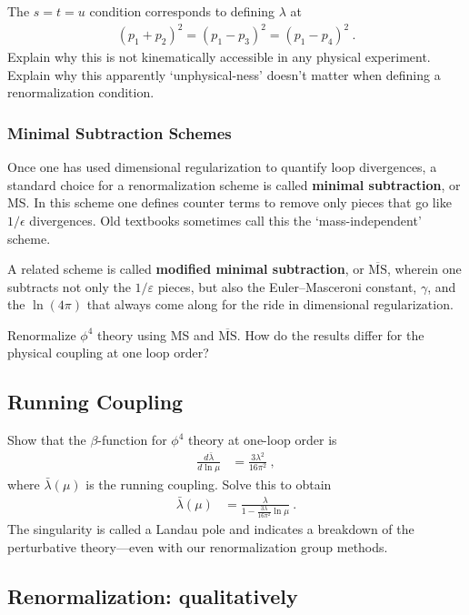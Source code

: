 \documentclass[12pt]{article}
\numberwithin{equation}{subsection}    %
\begin{document}
The $s=t=u$ condition corresponds to defining $\lambda$ at
\begin{align}
	(p_1+p_2)^2 = (p_1 - p_3)^2 = (p_1 - p_4)^2 \ .
\end{align}
Explain why this is not kinematically accessible in any physical experiment. Explain why this apparently `unphysical-ness' doesn't matter when defining a renormalization condition. 



\subsubsection{Minimal Subtraction Schemes}

Once one has used dimensional regularization to quantify loop divergences, a standard choice for a renormalization scheme is called \textbf{minimal subtraction}, or MS. In this scheme one defines counter terms to remove only pieces that go like $1/\epsilon$ divergences. Old textbooks sometimes call this the `mass-independent' scheme.

A related scheme is called \textbf{modified minimal subtraction}, or $\overline{\text{MS}}$, wherein one subtracts not only the $1/\varepsilon$ pieces, but also the Euler--Masceroni constant, $\gamma$, and the $\ln(4\pi)$ that always come along for the ride in dimensional regularization. 

Renormalize $\phi^4$ theory using MS and $\overline{\text{MS}}$. How do the results differ for the physical coupling at one loop order?

\subsection{Running Coupling}

Show that the $\beta$-function for $\phi^4$ theory at one-loop order is
\begin{align}
	\frac{d\bar\lambda}{d\ln\mu} &= \frac{3\lambda^2}{16\pi^2} \ ,
\end{align}
where $\bar\lambda(\mu)$ is the running coupling. Solve this to obtain
\begin{align}
	\bar\lambda(\mu)
	&= \frac{\lambda}{1 -\frac{3\lambda}{16\pi^2}\ln\mu} \ .
\end{align}
The singularity is called a Landau pole and indicates a breakdown of the perturbative theory---even with our renormalization group methods.

\subsection{Renormalization: qualitatively}
\end{document}
